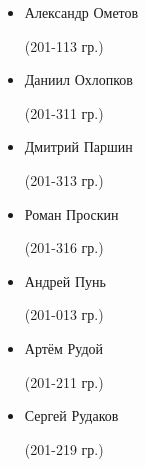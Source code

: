 \begin{multicols}{2}
\begin{small}
\begin{itemize}[leftmargin=*]
	\item[] Александр Ометов\begin{tiny} (201-113 гр.)\end{tiny} %
	\item[] Даниил Охлопков\begin{tiny} (201-311 гр.)\end{tiny}

	\item[] Дмитрий Паршин\begin{tiny} (201-313 гр.)\end{tiny} %
	\item[] Роман Проскин\begin{tiny} (201-316 гр.)\end{tiny} %
	\item[] Андрей Пунь\begin{tiny} (201-013 гр.)\end{tiny}

	\item[] Артём Рудой\begin{tiny} (201-211 гр.)\end{tiny} %
	\item[] Сергей Рудаков\begin{tiny} (201-219 гр.)\end{tiny} %


\end{itemize}
\end{small}
\end{multicols}
